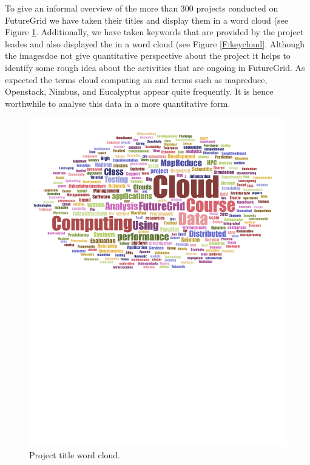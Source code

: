 To give an informal overview of the more than 300 projects conducted
on FutureGrid we have taken their titles and display them in a word
cloud (see Figure \ref{F:wordcloud}. Additionally, we have taken
keywords that are provided by the project leades and also displayed
the in a word cloud (see Figure \ref{F:keycloud}. Although the
imagesdoe not give quantitative perspective about the project it helps
to identify some rough idea about the activities that are ongoing in FutureGrid.
As expected the terms cloud computing an and terms such as mapreduce,
Openstack, Nimbus, and Eucalyptus appear quite frequently. It is hence
worthwhile to analyse this data in a more quantitative form.

\begin{figure}[htb]
\begin{minipage}[t]{0.5\textwidth}
  \centering
    \includegraphics[width=1.0\textwidth]{images/fg-title-wordcloud.pdf}
  \caption{Project title word cloud.}\label{F:wordcloud}
\end{minipage}
\begin{minipage}[t]{0.5\textwidth}

\end{minipage}
\end{figure}

